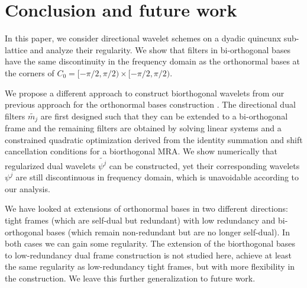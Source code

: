 \section{Conclusion and future work}\label{sec: end}
In this paper, we consider directional wavelet schemes on a dyadic quincunx sub-lattice and analyze their regularity. We show that filters in bi-orthogonal bases have the same discontinuity in the frequency domain as the orthonormal bases at the corners of $C_0 = [-\pi/2,\pi/2)\times[-\pi/2,\pi/2)$. 

 We propose a different approach to construct biorthogonal wavelets from our previous approach for the orthonormal bases construction \cite{yin2014orthshear}. The directional dual filters $\widetilde{m_j}$ are first designed such that they can be extended to a bi-orthogonal frame and the remaining filters are obtained by solving linear systems and a constrained quadratic optimization derived from the identity summation and shift cancellation conditions for a biorthogonal MRA. We show numerically that regularized dual wavelets $\widetilde{\psi^j}$ can be constructed, yet their corresponding wavelets $\psi^j$ are still discontinuous in frequency domain, which is unavoidable according to our analysis.

We have looked at extensions of orthonormal bases in two different directions: tight frames (which are self-dual but redundant) with low redundancy and bi-orthogonal bases (which remain non-redundant but are no longer self-dual). In both cases we can gain some regularity. The extension of the biorthogonal bases to low-redundancy dual frame construction is not studied here, achieve at least the same regularity as low-redundancy tight frames, but with more flexibility in the construction. We leave this further generalization to future work.